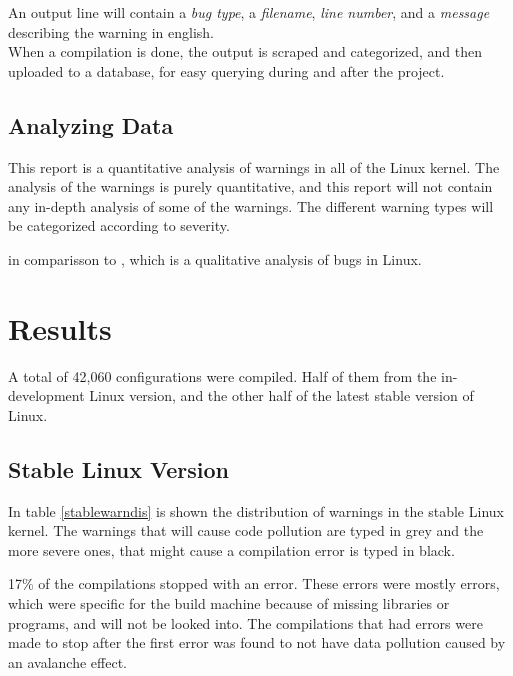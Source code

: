 \documentclass[a4paper,11pt]{report}
\begin{document}
An output line will contain a \emph{bug type}, a \emph{filename}, \emph{line 
number}, and a \emph{message} describing the warning in english.
\\

When a compilation is done, the output is scraped and categorized, and then 
uploaded to a database, for easy querying during and after the project. 


            \section{Analyzing Data}
This report is a quantitative analysis of warnings in all of the Linux kernel.
The analysis of the warnings is purely quantitative, and this report will not 
contain any in-depth analysis of some of the warnings. The different warning 
types will be categorized according to severity.

in comparisson to\cite{42bugs} , which 
is a qualitative analysis of bugs in Linux.




\newpage
\chapter{Results}

A total of 42,060 configurations were compiled. Half of them from the 
in-development Linux version, and the other half of the latest stable version 
of Linux.

            \section{Stable Linux Version}
In table \ref{stablewarndis} is shown the distribution of warnings in the 
stable Linux kernel. The warnings that will cause code pollution are typed in 
grey and the more severe ones, that might cause a compilation error is typed 
in black.

17\% of the compilations stopped with an error. These errors were mostly 
errors, which were specific for the build machine because of missing libraries 
or programs, and will not be looked into.  The compilations that had errors 
were made to stop after the first error was found to not have data pollution 
caused by an avalanche effect.
\end{document}
